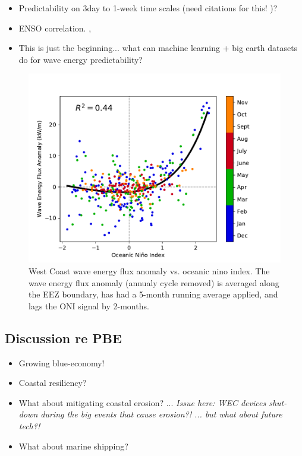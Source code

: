 \begin{itemize}
\item Predictability on 3day to 1-week time scales (need citations for this! )?
\item ENSO correlation. \citep{yangCharacteristicsVariabilityNearshore2020,andersonClimateIndexOptimized2018}, 
\item This is just the beginning... what can machine learning + big earth datasets do for wave energy predictability?
\end{itemize}


\begin{figure}[ht]
  \centering
  \includegraphics[width=\textwidth]{../fig/ENSO-Comparison.wc.pdf}
  \caption{West Coast wave energy flux anomaly vs. oceanic nino index. The wave energy flux anomaly (annualy cycle removed) is averaged along the EEZ boundary, has had a 5-month running average applied, and lags the ONI signal by 2-months.}
  \label{fig:wc-nino}
\end{figure}


\subsection{Discussion re PBE}

\begin{itemize}
\item Growing blue-economy!
\item Coastal resiliency?
\item What about mitigating coastal erosion? ... {\it Issue here: WEC devices shut-down during the big events that cause erosion?! ... but what about future tech?!}
\item What about marine shipping?
\end{itemize}


